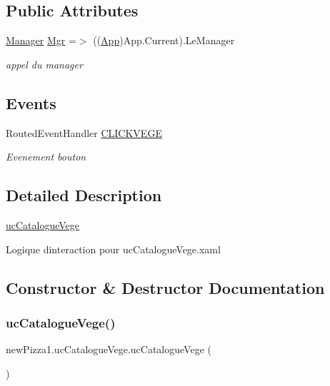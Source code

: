 \subsection*{Public Attributes}
\begin{DoxyCompactItemize}
\item 
\hyperlink{classModele_1_1Manager}{Manager} \hyperlink{classnewPizza1_1_1ucCatalogueVege_ad21f5966af508301ef7618c6a53af352}{Mgr} =$>$ ((\hyperlink{classnewPizza1_1_1App}{App})App.\+Current).Le\+Manager
\begin{DoxyCompactList}\small\item\em appel du manager \end{DoxyCompactList}\end{DoxyCompactItemize}
\subsection*{Events}
\begin{DoxyCompactItemize}
\item 
Routed\+Event\+Handler \hyperlink{classnewPizza1_1_1ucCatalogueVege_a83a034c219d0e1b01318e289900bebcc}{C\+L\+I\+C\+K\+V\+E\+GE}
\begin{DoxyCompactList}\small\item\em Evenement bouton \end{DoxyCompactList}\end{DoxyCompactItemize}


\subsection{Detailed Description}
\hyperlink{classnewPizza1_1_1ucCatalogueVege}{uc\+Catalogue\+Vege} 

Logique d\textquotesingle{}interaction pour uc\+Catalogue\+Vege.\+xaml 

\subsection{Constructor \& Destructor Documentation}
\mbox{\label{classnewPizza1_1_1ucCatalogueVege_af106052e8c25e90b258c03b84cd71e33}} 
\subsubsection{\texorpdfstring{uc\+Catalogue\+Vege()}{ucCatalogueVege()}}
{\footnotesize\ttfamily new\+Pizza1.\+uc\+Catalogue\+Vege.\+uc\+Catalogue\+Vege (\begin{DoxyParamCaption}{ }\end{DoxyParamCaption})\hspace{0.3cm}{\ttfamily [inline]}}



